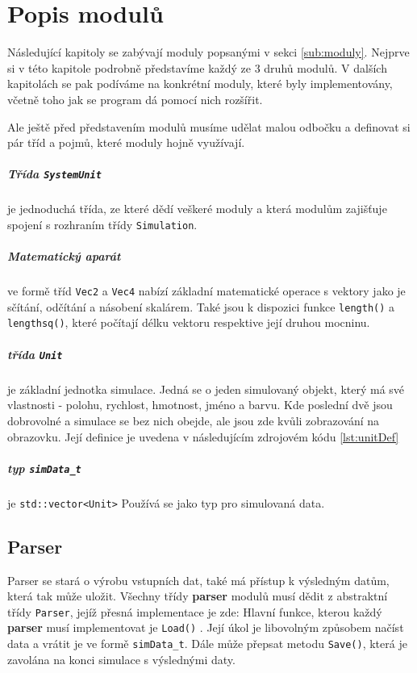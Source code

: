 \chapter{Popis modulů}
Následující kapitoly se zabývají moduly popsanými v sekci \ref{sub:moduly}.
Nejprve si v této kapitole podrobně představíme každý ze 3 druhů modulů.
V dalších kapitolách se pak podíváme na konkrétní moduly, které byly implementovány, včetně toho jak se program dá pomocí nich rozšířit.

Ale ještě před představením modulů musíme udělat malou odbočku a definovat si pár tříd a pojmů, které moduly hojně využívají.
\paragraph{Třída \texttt{SystemUnit}}
je jednoduchá třída, ze které dědí veškeré moduly a která modulům zajišťuje spojení s rozhraním třídy \texttt{Simulation}.
\paragraph{Matematický aparát}
ve formě tříd \texttt{Vec2} a \texttt{Vec4} nabízí základní matematické operace s vektory jako je sčítání, odčítání a násobení skalárem. Také jsou k dispozici funkce
\texttt{length()} a \texttt{lengthsq()}, které počítají délku vektoru respektive její druhou mocninu.
\paragraph{třída \texttt{Unit}}
je základní jednotka simulace. Jedná se o jeden simulovaný objekt, který má své vlastnosti - polohu, rychlost, hmotnost, jméno a barvu. Kde poslední dvě jsou dobrovolné a simulace se bez nich obejde, ale jsou zde kvůli zobrazování na obrazovku. Její definice je uvedena v následujícím zdrojovém kódu \ref{lst:unitDef}
\paragraph{typ \texttt{simData\_t}} je \texttt{std::vector<Unit>} Používá se jako typ pro simulovaná data.
\section{Parser}
Parser se stará o výrobu vstupních dat, také má přístup k výsledným datům, která tak může uložit. Všechny třídy \textbf{parser} modulů musí dědit z abstraktní třídy \texttt{Parser}, jejíž přesná implementace je zde:
Hlavní funkce, kterou každý \textbf{parser} musí implementovat je \texttt{Load()} . Její úkol je libovolným způsobem načíst data a vrátit je ve formě \texttt{simData\_t}. Dále může přepsat metodu \texttt{Save()}, která je zavolána na konci simulace s výslednými daty.
